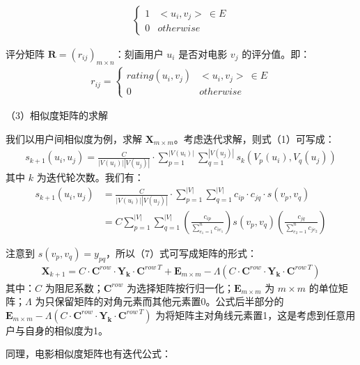 \begin{spacing}{1.5}
{\begin{align}
\begin{cases}
1 &<u_i,v_j>\ \in E \\
0 &otherwise
\end{cases}
\end{align}
}\par
评分矩阵 $\mathbf{R}=(r_{ij})_{m\times n}$：刻画用户 $u_i$ 是否对电影 $v_j$ 的评分值。即：
{\setlength\abovedisplayskip{1pt}
\setlength\belowdisplayskip{1pt}
\begin{align}
r_{ij} = 
\begin{cases}
rating(u_i,v_j) &<u_i,v_j>\ \in E \\
0 &otherwise
\end{cases}
\end{align}
}\par
（3）相似度矩阵的求解\par
我们以用户间相似度为例，求解 $\mathbf{X}_{m\times m}$。考虑迭代求解，则式（1）可写成：
{\setlength\abovedisplayskip{1pt}
\setlength\belowdisplayskip{1pt}
\begin{align}
s_{k+1}(u_i,u_j)=\frac{C}{|V(u_i)||V(u_j)|}\cdot \sum_{p=1}^{|V(u_i)|}\sum_{q=1}^{|V(u_j)|} {s_k(V_p(u_i),V_q(u_j))}
\end{align}
}
其中 $k$ 为迭代轮次数。我们有：
{\setlength\abovedisplayskip{1pt}
\setlength\belowdisplayskip{1pt}
\begin{align}
s_{k+1}(u_i,u_j)&=\frac{C}{|V(u_i)||V(u_j)|}\cdot \sum_{p=1}^{|V|}\sum_{q=1}^{|V|} {c_{ip}\cdot c_{jq}\cdot s(v_p,v_q)}\\
&=C\sum_{p=1}^{|V|}\sum_{q=1}^{|V|}(\frac{c_{ip}}{\sum_{e_1=1}^{n}c_{ie_1}})s(v_p,v_q)(\frac{c_{jq}}{\sum_{e_2=1}^n c_{je_2}})
\end{align}
}\par
注意到 $s(v_p,v_q)=y_{pq}$，所以（7）式可写成矩阵的形式：
{\setlength\abovedisplayskip{1pt}
\setlength\belowdisplayskip{1pt}
\begin{align}
\mathbf{X}_{k+1} = C\cdot\mathbf{C}^{row}\cdot \mathbf{Y_k} \cdot \mathbf{C}^{row\ T}+ \mathbf{E}_{m\times m} - \Lambda ({C\cdot\mathbf{C}^{row}\cdot \mathbf{Y_k} \cdot \mathbf{C}^{row\ T}})
\end{align}
}
其中：$C$ 为阻尼系数；$\mathbf{C}^{row}$ 为选择矩阵按行归一化；$\mathbf{E}_{m\times m}$ 为 $m\times m$ 的单位矩阵；$\Lambda$ 为只保留矩阵的对角元素而其他元素置0。公式后半部分的 $\mathbf{E}_{m\times m} - \Lambda ({C\cdot\mathbf{C}^{row}\cdot \mathbf{Y_k} \cdot \mathbf{C}^{row\ T}})$ 为将矩阵主对角线元素置1，这是考虑到任意用户与自身的相似度为1。\par
同理，电影相似度矩阵也有迭代公式：
{\setlength\abovedisplayskip{1pt}
}
\end{spacing}
